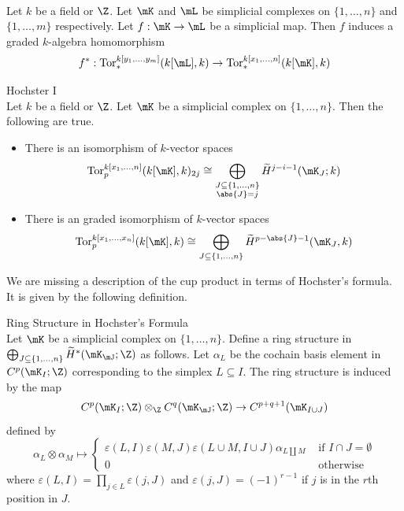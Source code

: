 \documentclass[a4paper]{article}
\begin{document}
\begin{prp}{}{}\\
Let $k$ be a field or $\Z$. Let $\mK$ and $\mL$ be simplicial complexes on $\{1,\dots,n\}$ and $\{1,\dots,m\}$ respectively. Let $f:\mK\to\mL$ be a simplicial map. Then $f$ induces a graded $k$-algebra homomorphism $$f^\ast:\text{Tor}_\ast^{k[y_1,\dots,y_m]}(k[\mL],k)\to\text{Tor}_\ast^{k[x_1,\dots,n]}(k[\mK],k)$$
\end{prp}

\begin{thm}{Hochster I}{}\\
Let $k$ be a field or $\Z$. Let $\mK$ be a simplicial complex on $\{1,\dots,n\}$. Then the following are true. 
\begin{itemize}
\item There is an isomorphism of $k$-vector spaces $$\text{Tor}_p^{k[x_1,\dots,n]}(k[\mK],k)_{2j}\cong\bigoplus_{\substack{J\subseteq\{1,\dots,n\}\\\abs{J}=j}}\widetilde{H}^{j-i-1}(\mK_J;k)$$
\item There is an graded isomorphism of $k$-vector spaces $$\text{Tor}_p^{k[x_1,\dots,x_n]}(k[\mK],k)\cong\bigoplus_{J\subseteq\{1,\dots,n\}}\widetilde{H}^{p-\abs{J}-1}(\mK_J,k)$$
\end{itemize}
\end{thm}

We are missing a description of the cup product in terms of Hochster's formula. It is given by the following definition. 

\begin{defn}{Ring Structure in Hochster's Formula}{}\\
Let $\mK$ be a simplicial complex on $\{1,\dots,n\}$. Define a ring structure in $\bigoplus_{J\subseteq\{1,\dots,n\}}\widetilde{H}^\ast(\mK_\mJ;\Z)$ as follows. Let $\alpha_L$ be the cochain basis element in $C^p(\mK_I;\Z)$ corresponding to the simplex $L\subseteq I$. The ring structure is induced by the map $$C^p(\mK_I;\Z)\otimes_\Z C^q(\mK_\mJ;\Z)\to C^{p+q+1}(\mK_{I\cup J})$$ defined by $$\alpha_L\otimes\alpha_M\mapsto\begin{cases}
\varepsilon(L,I)\varepsilon(M,J)\varepsilon(L\cup M,I\cup J)\alpha_{L\amalg M} & \text{ if }I\cap J=\emptyset\\
0 & \text{ otherwise }
\end{cases}$$
where $\varepsilon(L,I)=\prod_{j\in L}\varepsilon(j,J)$ and $\varepsilon(j,J)=(-1)^{r-1}$ if $j$ is in the $r$th position in $J$. 
\end{defn}
\end{document}
